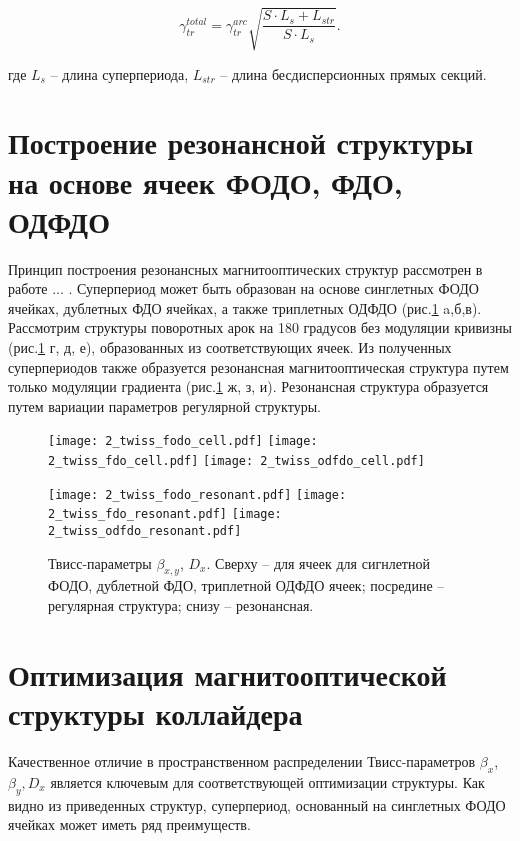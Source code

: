 \begin{equation}
\gamma_{tr}^{total}=\gamma_{tr}^{arc}\sqrt{\frac{S\cdot L_s+L_{str}}{S\cdot L_s}}.
\label {eq:gamma_tr_modulated}
\end{equation}

\noindent где $L_s$ -- длина суперпериода, $L_{str}$ -- длина бесдисперсионных прямых секций.

	\section{Построение резонансной структуры на основе ячеек ФОДО, ФДО, ОДФДО}\label{sec:transition_variation/methods/FODO_FDO}
	
\par Принцип построения резонансных магнитооптических структур рассмотрен в работе ... .
Суперпериод может быть образован на основе синглетных ФОДО ячейках, дублетных ФДО ячейках, а также триплетных ОДФДО (рис.\ref{fig:fodo_fdo_odfdo} a,б,в). Рассмотрим структуры поворотных арок на 180 градусов без модуляции кривизны (рис.\ref{fig:fodo_fdo_odfdo} г, д, е), образованных из соответствующих ячеек. Из полученных суперпериодов также образуется резонансная магнитооптическая структура путем только модуляции градиента (рис.\ref{fig:fodo_fdo_odfdo} ж, з, и). Резонансная структура образуется путем вариации параметров регулярной структуры.

\begin{figure} [h!]

   \texttt{[image: 2\_twiss\_fodo\_cell.pdf]}
   \texttt{[image: 2\_twiss\_fdo\_cell.pdf]}
   \texttt{[image: 2\_twiss\_odfdo\_cell.pdf]}

   \texttt{[image: 2\_twiss\_fodo\_resonant.pdf]}
   \texttt{[image: 2\_twiss\_fdo\_resonant.pdf]}
   \texttt{[image: 2\_twiss\_odfdo\_resonant.pdf]}

   \caption{Твисс-параметры $\beta_{x,y}$, $D_{x}$. Сверху -- для ячеек для сигнлетной ФОДО, дублетной ФДО, триплетной ОДФДО ячеек; посредине -- регулярная структура; снизу -- резонансная.}
   \label{fig:fodo_fdo_odfdo}
\end{figure}

	\section{Оптимизация магнитооптической структуры коллайдера}\label{sec:transition_variation/methods/optimization}
\par Качественное отличие в пространственном распределении Твисс-параметров $\beta_{x}$, $\beta_{y}, D_{x}$ является ключевым для соответствующей оптимизации структуры.
Как видно из приведенных структур, суперпериод, основанный на синглетных ФОДО ячейках может иметь ряд преимуществ.

